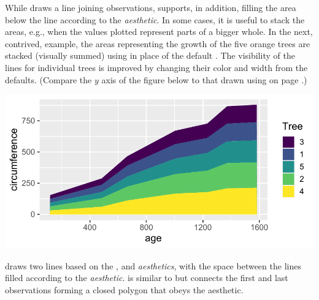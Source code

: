 \documentclass[krantz2]{krantz}\usepackage{knitr}
\begin{document}
While  draws a line joining observations,  supports, in addition, filling the area below the line according to the  \emph{aesthetic}. In some cases, it is useful to stack the areas, e.g., when the values plotted represent parts of a bigger whole. In the next, contrived, example, the areas representing the growth of the five orange trees are stacked (visually summed) using  in place of the default . The visibility of the lines for individual trees is improved by changing their color and width from the defaults. (Compare the $y$ axis of the figure below to that drawn using  on page \pageref{plot:fig:lines}.)

\begin{knitrout}\footnotesize
{}\color{fgcolor}\begin{kframe}
\begin{alltt}
 \hlkwb{<-} 
  \hlstd{(} 
          \hlstd{=} \hlstd{(}      \hlopt{+}
  \hlstd{(} \hlstd{=} \hlstd{,}  \hlstd{=} \hlstd{,}  \hlstd{=} \hlstd{)}
\end{alltt}
\end{kframe}

{\centering \includegraphics[width=.7\textwidth]{figure/pos-area-plot-01-1} 

}


\end{knitrout}

 draws two lines based on the ,  and  \emph{aesthetics}, with the space between the lines filled according to the  \emph{aesthetic}.  is similar to  but connects the first and last observations forming a closed polygon that obeys the  aesthetic.
\end{document}

